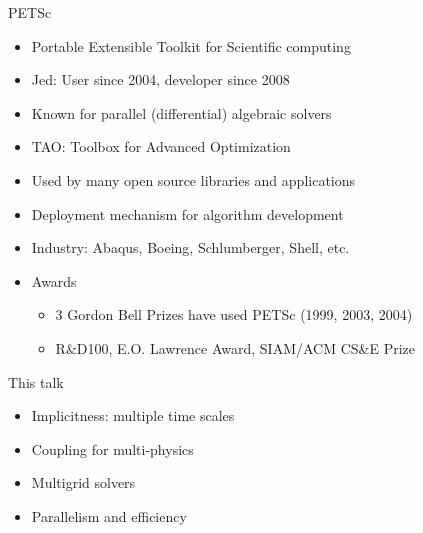 \documentclass{beamer}
\begin{document}
\begin{frame}{PETSc}
  \begin{itemize}
  \item Portable Extensible Toolkit for Scientific computing
  \item Jed: User since 2004, developer since 2008
  \item Known for parallel (differential) algebraic solvers
  \item TAO: Toolbox for Advanced Optimization
  \item Used by many open source libraries and applications
  \item Deployment mechanism for algorithm development
  \item Industry: Abaqus, Boeing, Schlumberger, Shell, etc.
  \item Awards
    \begin{itemize}
    \item 3 Gordon Bell Prizes have used PETSc (1999, 2003, 2004)
    \item R\&D100, E.O. Lawrence Award, SIAM/ACM CS\&E Prize
    \end{itemize}
  \end{itemize}
\end{frame}

\begin{frame}{This talk}
  \begin{itemize}
  \item Implicitness: multiple time scales
  \item Coupling for multi-physics
  \item Multigrid solvers
    \vspace{2em}
  \item Parallelism and efficiency
  \end{itemize}
\end{frame}
\end{document}
